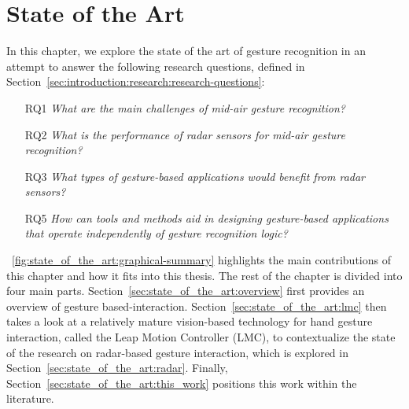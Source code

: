 \chapter{State of the Art} \label{chap:state_of_the_art}

In this chapter, we explore the state of the art of gesture recognition in an attempt to answer the following research questions, defined in Section~\ref{sec:introduction:research:research-questions}:
\begin{itemize}
    \item [RQ1] \textit{What are the main challenges of mid-air gesture recognition?} %
    \item [RQ2] \textit{What is the performance of radar sensors for mid-air gesture recognition?}
    \item [RQ3] \textit{What types of gesture-based applications would benefit from radar sensors?} %
    \item [RQ5] \textit{How can tools and methods aid in designing gesture-based applications that operate independently of gesture recognition logic?}
\end{itemize}
\fig~\ref{fig:state_of_the_art:graphical-summary} highlights the main contributions of this chapter and how it fits into this thesis. The rest of the chapter is divided into four main parts.
Section~\ref{sec:state_of_the_art:overview} first provides an overview of gesture based-interaction. %
Section~\ref{sec:state_of_the_art:lmc} then takes a look at a relatively mature vision-based technology for hand gesture interaction, called the Leap Motion Controller (LMC), to contextualize the state of the research on radar-based gesture interaction, which is explored in Section~\ref{sec:state_of_the_art:radar}.
Finally, Section~\ref{sec:state_of_the_art:this_work} positions this work within the literature.

